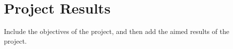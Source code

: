 \chapter{Project Results } Include the objectives of the project, and then add the aimed results of the project. 
